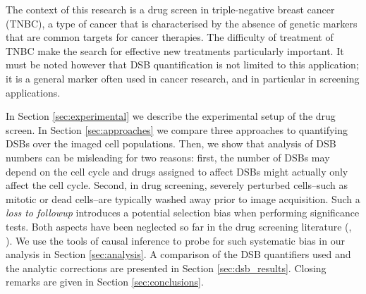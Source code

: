 The context of this research is a drug screen in triple-negative breast cancer (TNBC), a type of cancer that is characterised by the absence of genetic markers that are common targets for cancer therapies. The difficulty of treatment of TNBC make the search for effective new treatments particularly important. It must be noted however that DSB quantification is not limited to this application; it is a general marker often used in cancer research, and in particular in screening applications. 



In Section \ref{sec:experimental} we describe the experimental setup of the drug screen. In Section \ref{sec:approaches} we compare three approaches to quantifying DSBs over the imaged cell populations.
Then, we show that analysis of DSB numbers can be misleading for two reasons: first, the number of DSBs may depend on the cell cycle and drugs assigned to affect DSBs might actually only affect the cell cycle. Second, in drug screening, severely perturbed cells--such as mitotic or dead cells--are typically washed away prior to image acquisition. Such a \emph{loss to followup} introduces a potential selection bias when performing significance tests. Both aspects have been neglected so far in the drug screening literature (\cite{avondoglio2009high}, \cite{garcia2013assessment}). We use the tools of causal inference to probe for such systematic bias in our analysis in Section \ref{sec:analysis}. A comparison of the DSB quantifiers used and the analytic corrections are presented in Section \ref{sec:dsb_results}. Closing remarks are given in Section \ref{sec:conclusions}.

